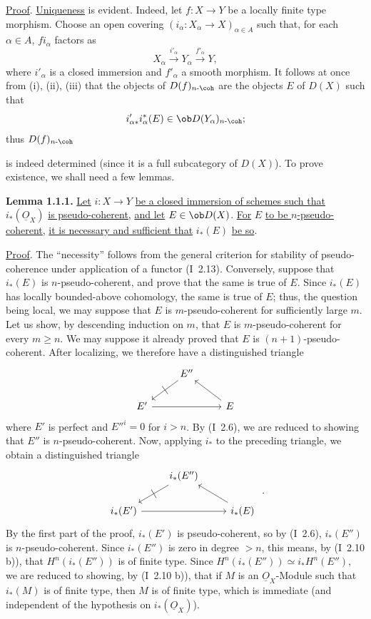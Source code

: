 \uline{Proof}. \uline{Uniqueness} is evident. Indeed, let \(f:X\to Y\) be a locally finite type morphism. Choose an open covering \((i_\alpha:X_\alpha\to X)_{\alpha\in A}\) such that, for each \(\alpha\in A\), \(fi_\alpha\) factors as
\[
  X_\alpha\xrightarrow{i'_\alpha}Y_\alpha\xrightarrow{f'_\alpha}Y,
\]
where \(i'_\alpha\) is a closed immersion and \(f'_\alpha\) a smooth morphism. It follows at once from (i), (ii), (iii) that the objects of \(D(f)_{n\text{-}\coh}\) are the objects \(E\) of \(D(X)\) such that
\[
  i'_{\alpha *}i_\alpha^*(E)\in \ob D(Y_\alpha)_{n\text{-}\coh};
\]
thus \(D(f)_{n\text{-}\coh}\)

is indeed determined (since it is a full subcategory of \(D(X)\)). To prove existence, we shall need a few lemmas.

\textbf{Lemma 1.1.1.} \uline{Let} \(i:X\to Y\) \uline{be a closed immersion of schemes such that} \(i_*(\underline{O}_X)\) \uline{is pseudo-coherent}, \uline{and let} \(E\in\ob D(X)\). \uline{For} \(E\) \uline{to be \(n\)-pseudo-coherent}, \uline{it is necessary and sufficient that} \(i_*(E)\) \uline{be so}.

\uline{Proof}. The ``necessity'' follows from the general criterion for stability of pseudo-coherence under application of a functor (I~2.13). Conversely, suppose that \(i_*(E)\) is \(n\)-pseudo-coherent, and prove that the same is true of \(E\). Since \(i_*(E)\) has locally bounded-above cohomology, the same is true of \(E\); thus, the question being local, we may suppose that \(E\) is \(m\)-pseudo-coherent for sufficiently large \(m\). Let us show, by descending induction on \(m\), that \(E\) is \(m\)-pseudo-coherent for every \(m\geq n\). We may suppose it already proved that \(E\) is \((n+1)\)-pseudo-coherent. After localizing, we therefore have a distinguished triangle
\[
\begin{tikzcd}
& E'' \arrow[dl,"|" marking] & \\
E' \arrow[rr] & & E \arrow[ul]
\end{tikzcd}
\]
where \(E'\) is perfect and \(E''^i=0\) for \(i>n\). By (I~2.6), we are reduced to showing that \(E''\) is \(n\)-pseudo-coherent. Now, applying \(i_*\) to the preceding triangle, we obtain a distinguished triangle
\[
\begin{tikzcd}
& i_*(E'') \arrow[dl,"|" marking] & \\
i_*(E') \arrow[rr] & & i_*(E) \arrow[ul]
\end{tikzcd}\ .
\]
By the first part of the proof, \(i_*(E')\) is pseudo-coherent, so by (I~2.6), \(i_*(E'')\) is \(n\)-pseudo-coherent. Since \(i_*(E'')\) is zero in degree \(>n\), this means, by (I~2.10 b)), that \(H^n(i_*(E''))\) is of finite type. Since \(H^n(i_*(E''))\simeq i_*H^n(E'')\), we are reduced to showing, by (I~2.10 b)), that if \(M\) is an \(\underline{O}_X\)-Module such that \(i_*(M)\) is of finite type, then \(M\) is of finite type, which is immediate (and independent of the hypothesis on \(i_*(\underline{O}_X)\)).

